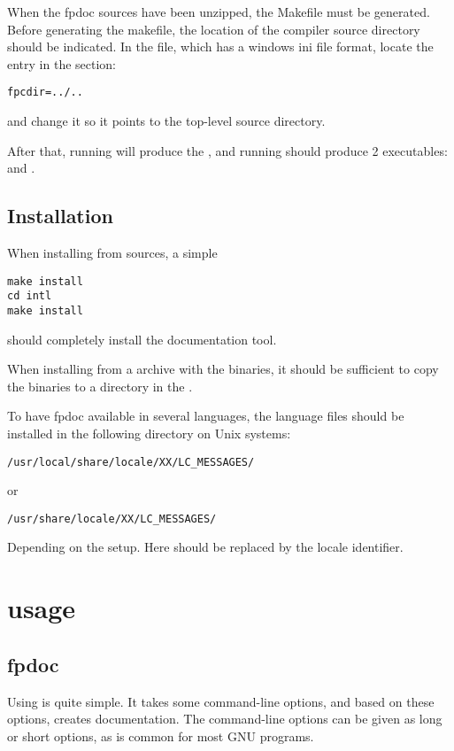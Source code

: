 When the fpdoc sources have been unzipped, the Makefile must be generated.
Before generating the makefile, the location of the compiler source
directory should be indicated. In the  file, which has a 
windows ini file format, locate the  entry in the  
section:
\begin{verbatim}
fpcdir=../..
\end{verbatim}
and change it so it points to the top-level \fpc source directory.

After that, running  will produce the , and
running  should produce 2 executables:  and
.

\section{Installation}

When installing from sources, a simple 
\begin{verbatim}
make install
cd intl
make install
\end{verbatim}
should completely install the documentation tool.

When installing from a archive with the binaries, it should be sufficient
to copy the binaries to a directory in the .

To have fpdoc available in several languages, the language files should be
installed in the following directory on Unix systems:
\begin{verbatim}
/usr/local/share/locale/XX/LC_MESSAGES/
\end{verbatim}
or
\begin{verbatim}
/usr/share/locale/XX/LC_MESSAGES/
\end{verbatim}
Depending on the setup. Here  should be replaced by the locale 
identifier.

\chapter{\fpdoc usage}
\label{ch:usage}

\section{fpdoc}
Using \fpdoc is quite simple. It takes some command-line options, and based
on these options, creates documentation. The command-line options can be
given as long or short options, as is common for most GNU programs.

